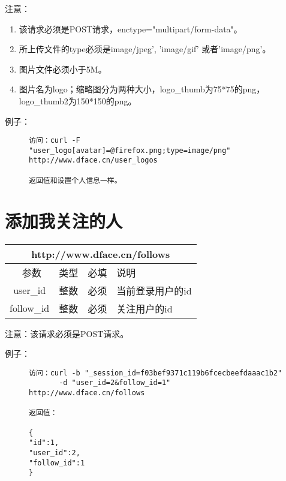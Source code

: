 \documentclass[cs4size]{ctexartutf8}
\begin{document}
注意：

\begin{enumerate}
\item 该请求必须是POST请求，enctype="multipart/form-data"。
\item 所上传文件的type必须是image/jpeg', 'image/gif' 或者'image/png'。
\item 图片文件必须小于5M。
\item 图片名为logo；缩略图分为两种大小，logo\_thumb为75*75的png，logo\_thumb2为150*150的png。
\end{enumerate}

例子：

\begin{figure}[H]
\begin{verbatim}
访问：curl -F "user_logo[avatar]=@firefox.png;type=image/png" 
http://www.dface.cn/user_logos

返回值和设置个人信息一样。

\end{verbatim}
\end{figure}





\section{添加我关注的人}

\begin{table}[H]
   \begin{center}
\begin{tabular}{|c|c|c|p{12cm}|}
\hline
\multicolumn{4}{|c|}{http://www.dface.cn/follows} \\
\hline\hline
 \  参数  & 类型 & 必填 &  说明  \\
\hline
 user\_id  & 整数 & 必须 &  当前登录用户的id\\
\hline
 follow\_id  & 整数 & 必须 &  关注用户的id\\
\hline
\end{tabular}
   \end{center}
\end{table}

注意：该请求必须是POST请求。

例子：

\begin{figure}[H]
\begin{verbatim}
访问：curl -b "_session_id=f03bef9371c119b6fcecbeefdaaac1b2"
       -d "user_id=2&follow_id=1" http://www.dface.cn/follows

返回值：

{
"id":1,
"user_id":2,
"follow_id":1
}

\end{verbatim}
\end{figure}
\end{document}
